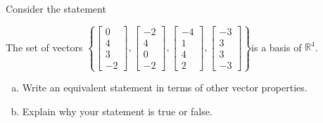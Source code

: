 
\begin{exerciseStatement}


Consider the statement 
\begin{center}\begin{minipage}{0.8\textwidth}
 The set of vectors \( \left\{ \left[\begin{array}{c}
0 \\
4 \\
3 \\
-2
\end{array}\right] , \left[\begin{array}{c}
-2 \\
4 \\
0 \\
-2
\end{array}\right] , \left[\begin{array}{c}
-4 \\
1 \\
4 \\
2
\end{array}\right] , \left[\begin{array}{c}
-3 \\
3 \\
3 \\
-3
\end{array}\right] \right\} \)is a basis of \(\mathbb{R}^4\). 
\end{minipage}\end{center}
    


\begin{enumerate}[(a)]
\item  Write an equivalent statement in terms of other vector properties.
\item  Explain why your statement is true or false.
\end{enumerate}
    
\end{exerciseStatement}
    
